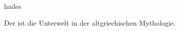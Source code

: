 \documentclass{stex}
\begin{document}
\begin{smodule}[sig=en]{hades}
\begin{sparagraph}[style=symdoc]
Der  ist die Unterwelt in der altgriechischen Mythologie.
\end{sparagraph}
\end{smodule}
\end{document}
